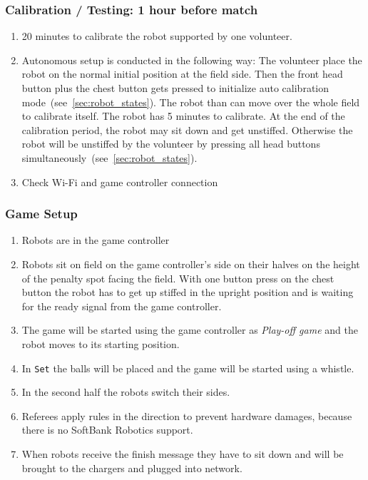 \subsubsection{Calibration / Testing: 1 hour before match}
    \begin{enumerate}
        \item 20 minutes to calibrate the robot supported by one volunteer.
        \item Autonomous setup is conducted in the following way: The volunteer place the robot on the normal initial position at the field side. Then the front head button plus the chest button gets pressed to initialize auto calibration mode~(see~\ref{sec:robot_states}). The robot than can move over the whole field to calibrate itself. The robot has 5 minutes to calibrate. At the end of the calibration period, the robot may sit down and get unstiffed. Otherwise the robot will be unstiffed by the volunteer by pressing all head buttons simultaneously~(see~\ref{sec:robot_states}). 

        \item  Check Wi-Fi and game controller connection
    \end{enumerate}

\subsubsection{Game Setup}

	\begin{enumerate}
		\item Robots are in the game controller
		\item Robots sit on field on the game controller's side on their halves on the height of the penalty spot facing the field. With one button press on the chest button the robot has to get up stiffed in the upright position and is waiting for the ready signal from the game controller.
		\item The game will be started using the game controller as \textit{Play-off game} and the robot moves to its starting position.
		\item In \texttt{Set} the balls will be placed and the game will be started using a whistle.
		\item In the second half the robots switch their sides.
		\item Referees apply rules in the direction to prevent hardware damages, because there is no SoftBank Robotics support.
		\item When robots receive the finish message they have to sit down and will be brought to the chargers and plugged into network.
	\end{enumerate}
	
